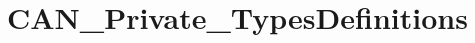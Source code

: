 \hypertarget{group___c_a_n___private___types_definitions}{\section{C\-A\-N\-\_\-\-Private\-\_\-\-Types\-Definitions}
\label{group___c_a_n___private___types_definitions}
}
